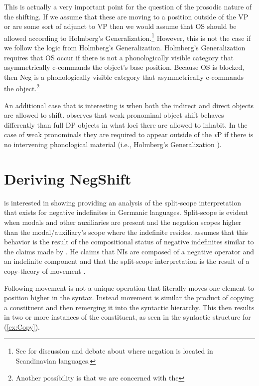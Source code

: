 \documentclass[12pt, letterpaper]{article}
\begin{document}
This is actually a very important point for the question of the prosodic nature of the shifting. If we assume that these are moving to a position outside of the VP or are some sort of adjunct to VP then we would assume that OS should be allowed according to Holmberg's Generalization.\footnote{See \citet{thrainssonSyntaxIcelandic2010} for discussion and debate about where negation is located in Scandinavian languages.} However, this is not the case if we follow the logic from Holmberg's Generalization. Holmberg's Generalization requires that OS occur if there is not a phonologically visible category that asymmetrically c-commands the object's base position. Because OS is blocked, then Neg is a phonologically visible category that asymmetrically c-commands the object.\footnote{Another possibility is that we are concerned with the }

An additional case that is interesting is when both the indirect and direct objects are allowed to shift. \citet[417f]{broekhuisUnificationObjectShift2020} observes that weak pronominal object shift behaves differently than full DP objects in what loci there are allowed to inhabit. In the case of weak pronominals they are required to appear outside of the \textit{v}P if there is no intervening phonological material (i.e., Holmberg's Generalization \cite{holmbergWordOrderSyntactic1986,holmbergRemarksHolmbergGeneralization1999}). 
\section{Deriving NegShift} \label{sec:ZEIJLSTRA}

\citet{zeijlstraSyntacticallyComplexStatus2011} is interested in showing providing an analysis of the split-scope interpretation that exists for negative indefinites in Germanic languages. Split-scope is evident when modals and other auxiliaries are present and the negation scopes higher than the modal/auxiliary's scope where the indefinite resides. \citeauthor{zeijlstraSyntacticallyComplexStatus2011} assumes that this behavior is the result of the compositional status of negative indefinites similar to the claims made by \citet{iatridouNegativeDPsAMovement2011}. He claims that NIs are composed of a negative operator and an indefinite component and that the split-scope interpretation is the result of a copy-theory of movement \citep{chomskyMinimalistProgram2015}. 

Following \citeauthor{chomskyMinimalistProgram2015} movement is not a unique operation that literally moves one element to position higher in the syntax. Instead movement is similar the product of copying a constituent and then remerging it into the syntactic hierarchy. This then results in two or more instances of the constituent, as seen in the syntactic structure for (\ref{ex:Copy}). 
\end{document}
